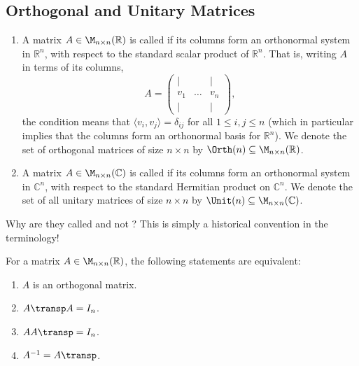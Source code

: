 \subsection*{Orthogonal and Unitary Matrices}

\begin{definition}
\label{def:orthogonal_unitary_matrices}
\begin{enumerate}[label=\textbf{(\alph*)}]
    \item A matrix $A \in \M_{n \times n}(\mathbb{R})$ is called  if its columns form an orthonormal system in $\mathbb{R}^n$, with respect to the standard scalar product of $\mathbb{R}^n$. That is, writing $A$ in terms of its columns,
    \[
        A = \begin{pmatrix} | & & | \\ v_1 & \dots & v_n \\ | & & | \end{pmatrix},
    \]
    the condition means that $\langle v_i, v_j \rangle = \delta_{ij}$ for all $1 \leq i, j \leq n$ (which in particular implies that the columns form an orthonormal basis for $\mathbb{R}^n$). We denote the set of orthogonal matrices of size $n \times n$ by $\Orth(n) \subseteq \M_{n \times n}(\mathbb{R})$.
    \item A matrix $A \in \M_{n \times n}(\mathbb{C})$ is called  if its columns form an orthonormal system in $\mathbb{C}^n$, with respect to the standard Hermitian product on $\mathbb{C}^n$. We denote the set of all unitary matrices of size $n \times n$ by $\Unit(n) \subseteq \M_{n \times n}(\mathbb{C})$.
\end{enumerate}
\end{definition}

\begin{remark}
Why are they called  and not ? This is simply a historical convention in the terminology!
\end{remark}

\begin{lemma}
\label{lem:char_orthogonal_matrices}
For a matrix $A \in \M_{n \times n}(\mathbb{R})$, the following statements are equivalent:
\begin{enumerate}[label=\textbf{(\alph*)}]
    \item $A$ is an orthogonal matrix.
    \item $A\transp A = I_n$.
    \item $A A\transp = I_n$.
    \item $A^{-1} = A\transp$.
\end{enumerate}
\end{lemma}

